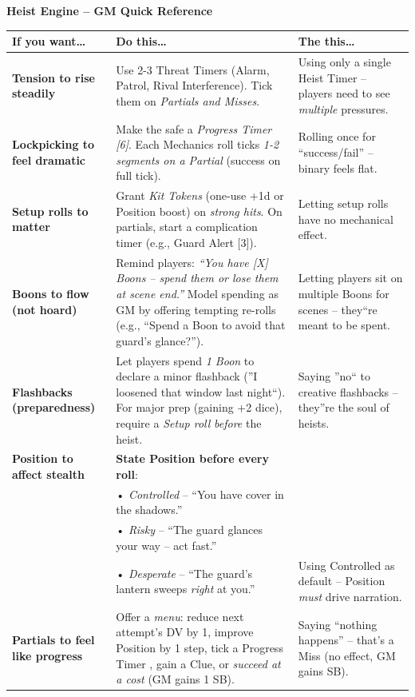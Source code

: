 \documentclass[10pt,twoside]{book}
\begin{document}
\begin{heistengine}
\textbf{Heist Engine -- GM Quick Reference}
\begin{tabular}{>{\raggedright\arraybackslash}p{} >{\centering\arraybackslash}p{} >{\raggedleft\arraybackslash}p{}}
\toprule
\textbf{If you want\dots} & \textbf{Do this\dots} & \textbf{The this\dots} \\
\midrule
\textbf{Tension to rise steadily} & Use 2-3 Threat Timers (Alarm, Patrol, Rival Interference). Tick them on \textit{Partials and Misses}. & Using only a single Heist Timer -- players need to see \textit{multiple} pressures. \\
\textbf{Lockpicking to feel dramatic} & Make the safe a \textit{Progress Timer [6]}. Each Mechanics roll ticks \textit{1-2 segments on a Partial} (success on full tick). & Rolling once for ``success/fail'' -- binary feels flat. \\
\textbf{Setup rolls to matter} & Grant \textit{Kit Tokens} (one-use +1d or Position boost) on \textit{strong hits}. On partials, start a complication timer (e.g., Guard Alert [3]). & Letting setup rolls have no mechanical effect. \\
\textbf{Boons to flow (not hoard)} & Remind players: \textit{``You have [X] Boons -- spend them or lose them at scene end.''} Model spending as GM by offering tempting re-rolls (e.g., ``Spend a Boon to avoid that guard's glance?''). & Letting players sit on multiple Boons for scenes -- they``re meant to be spent. \\
\textbf{Flashbacks (preparedness)} & Let players spend \textit{1 Boon} to declare a minor flashback (''I loosened that window last night``). For major prep (gaining +2 dice), require a \textit{Setup roll} \textit{before} the heist. & Saying ''no`` to creative flashbacks -- they''re the soul of heists. \\
\textbf{Position to affect stealth} & \textbf{State Position before every roll}:\\
& • \textit{Controlled} -- ``You have cover in the shadows.''\\
& • \textit{Risky} -- ``The guard glances your way -- act fast.''\\
& • \textit{Desperate} -- ``The guard's lantern sweeps \textit{right} at you.'' & Using Controlled as default -- Position \textit{must} drive narration. \\
\textbf{Partials to feel like progress} & Offer a \textit{menu}: reduce next attempt's DV by 1, improve Position by 1 step, tick a Progress Timer , gain a Clue, or \textit{succeed at a cost} (GM gains 1 SB). & Saying ``nothing happens'' -- that's a Miss (no effect, GM gains SB). \\

\end{tabular}
\end{heistengine}
\end{document}
